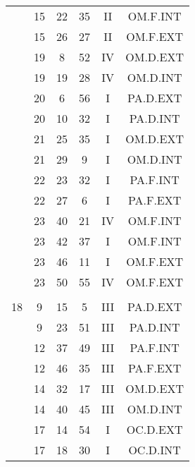 \documentclass[12pt, a4paper]{article}
\begin{document}
\begin{multicols}{3}
{\begin{tabular}{c c c c c c}
	 	 	 	 & 15 & 22 & 35 & II & OM.F.INT\\%
	 	 	 	 & 15 & 26 & 27 & II & OM.F.EXT\\%
	 	 	 	 & 19 & 8 & 52 & IV & OM.D.EXT\\%
	 	 	 	 & 19 & 19 & 28 & IV & OM.D.INT\\%
	 	 	 	 & 20 & 6 & 56 & I & PA.D.EXT\\%
	 	 	 	 & 20 & 10 & 32 & I & PA.D.INT\\%
	 	 	 	 & 21 & 25 & 35 & I & OM.D.EXT\\%
	 	 	 	 & 21 & 29 & 9 & I & OM.D.INT\\%
	 	 	 	 & 22 & 23 & 32 & I & PA.F.INT\\%
	 	 	 	 & 22 & 27 & 6 & I & PA.F.EXT\\%
	 	 	 	 & 23 & 40 & 21 & IV & OM.F.INT\\%
	 	 	 	 & 23 & 42 & 37 & I & OM.F.INT\\%
	 	 	 	 & 23 & 46 & 11 & I & OM.F.EXT\\%
	 	 	 	 & 23 & 50 & 55 & IV & OM.F.EXT\\%
	 	 	 	 & & & & & \\%
	 	 	 	18 & 9 & 15 & 5 & III & PA.D.EXT\\%
	 	 	 	 & 9 & 23 & 51 & III & PA.D.INT\\%
	 	 	 	 & 12 & 37 & 49 & III & PA.F.INT\\%
	 	 	 	 & 12 & 46 & 35 & III & PA.F.EXT\\%
	 	 	 	 & 14 & 32 & 17 & III & OM.D.EXT\\%
	 	 	 	 & 14 & 40 & 45 & III & OM.D.INT\\%
	 	 	 	 & 17 & 14 & 54 & I & OC.D.EXT\\%
	 	 	 	 & 17 & 18 & 30 & I & OC.D.INT\\%

\end{tabular}}
\end{multicols}
\end{document}
